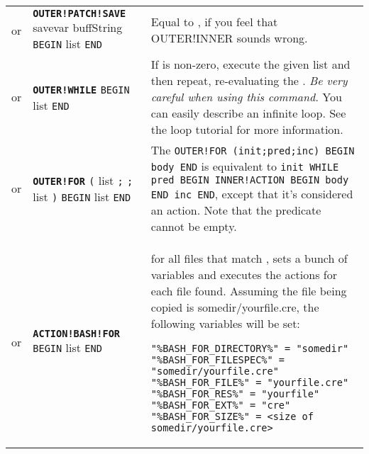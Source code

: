 \documentclass{article}
\def\ttref#1{\ahrefloc{#1}{\tt #1}}
\def\DEFINE#1{{\tt \bf #1}\label{#1}\index{#1}}
\def\t#1{{\tt #1}}
\def\Slist{{\color{red} list }}
\begin{document}
\begin{tabular}{cp{10in}|p{10in}}
or & \DEFINE{OUTER!PATCH!SAVE} savevar buffString \t{BEGIN} \ttref{patch} \Slist \t{END} &
  Equal to \ttref{OUTER!INNER!PATCH!SAVE}, if you feel that OUTER!INNER sounds wrong. \\
or & \DEFINE{OUTER!WHILE} \ttref{value} \t{BEGIN}
  \ttref{TP2 Action} \Slist \t{END} &
  If \ttref{value} is non-zero, execute the given \ttref{TP2 Action} \Slist and
  then repeat, re-evaluating the \ttref{value}.
  {\em Be very careful when using this command. } You can easily describe
  an infinite loop. See the \ttref{WHILE} loop tutorial for more
  information.
  \\
or & \DEFINE{OUTER!FOR} \t{(} \ttref{patch} \Slist \t{;}
                        \ttref{value} \t{;}
                        \ttref{patch} \Slist \t{)}
                  \t{BEGIN} \ttref{TP2 Action} \Slist \t{END} &
  The \ttref{TP2 Action} \t{OUTER!FOR (init;pred;inc) BEGIN body END} is equivalent to
  \t{init WHILE pred BEGIN INNER!ACTION BEGIN body END inc END}, except that
  it's considered an action. Note that the predicate \ttref{value} cannot be empty.  \\
or & \DEFINE{ACTION!BASH!FOR} \ttref{directory-file-regexp} \t{BEGIN} \ttref{TP2 Action} \Slist \t{END} &
  for all files that match \ttref{directory-file-regexp}, sets a bunch of variables
  and executes the actions for each file found. Assuming the file being copied
  is somedir/yourfile.cre, the following variables will be set:
\begin{verbatim}
"%BASH_FOR_DIRECTORY%" = "somedir"
"%BASH_FOR_FILESPEC%" = "somedir/yourfile.cre"
"%BASH_FOR_FILE%" = "yourfile.cre"
"%BASH_FOR_RES%" = "yourfile"
"%BASH_FOR_EXT%" = "cre"
"%BASH_FOR_SIZE%" = <size of somedir/yourfile.cre>
\end{verbatim}                                           \\


\end{tabular}
\end{document}
